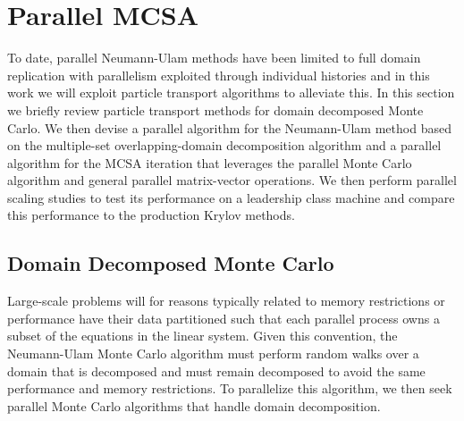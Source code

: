 \documentclass[letterpaper,11pt]{article}
\begin{document}
\section{Parallel MCSA}
\label{sec:parallel_mcsa}
To date, parallel Neumann-Ulam methods have been limited to full
domain replication with parallelism exploited through individual
histories \cite{alexandrov_efficient_1998} and in this work we will
exploit particle transport algorithms to alleviate this. In this
section we briefly review particle transport methods for domain
decomposed Monte Carlo. We then devise a parallel algorithm for the
Neumann-Ulam method based on the multiple-set overlapping-domain
decomposition algorithm and a parallel algorithm for the MCSA
iteration that leverages the parallel Monte Carlo algorithm and
general parallel matrix-vector operations. We then perform parallel
scaling studies to test its performance on a leadership class machine
and compare this performance to the production Krylov methods.

\subsection{Domain Decomposed Monte Carlo}
\label{subsec:msod}
Large-scale problems will for reasons typically related to memory
restrictions or performance have their data partitioned such that each
parallel process owns a subset of the equations in the linear
system. Given this convention, the Neumann-Ulam Monte Carlo algorithm
must perform random walks over a domain that is decomposed and must
remain decomposed to avoid the same performance and memory
restrictions. To parallelize this algorithm, we then seek parallel
Monte Carlo algorithms that handle domain decomposition.
\end{document}
